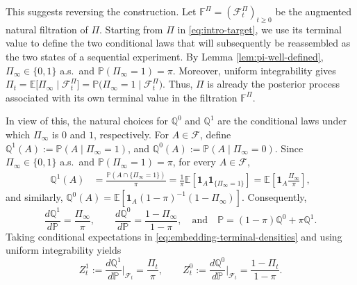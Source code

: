 \documentclass[11pt, reqno]{amsart}
\theoremstyle{plain}
\theoremstyle{remark}
\numberwithin{equation}{section}
\begin{document}
This suggests reversing the construction. Let $\mathbb{F}^\Pi=(\mathcal{F}^\Pi_t)_{t\geq0}$ be the augmented natural filtration of $\Pi$. Starting from $\Pi$ in \eqref{eq:intro-target}, we use its terminal value to define the two conditional laws that will subsequently be reassembled as the two states of a sequential experiment. By
Lemma \ref{lem:pi-well-defined},
$\Pi_\infty\in\{0,1\}$ a.s.~and
$\mathbb P(\Pi_\infty=1)=\pi$. Moreover, uniform integrability gives $\Pi_t
  =
  \mathbb E
  \bigl[\Pi_\infty\mid\mathcal F_t^\Pi\bigr]
  =
  \mathbb P
  \bigl(\Pi_\infty=1\mid\mathcal F_t^\Pi\bigr)$.
Thus, $\Pi$ is already the posterior process associated with its own
terminal value in the filtration $\mathbb F^\Pi$. 

In view of this, the natural choices for $\mathbb Q^0$ and
$\mathbb Q^1$ are the conditional laws under which $\Pi_{\infty}$ is $0$ and $1$, respectively. For $A\in\mathcal F$,
define $\mathbb Q^1(A)
  :=
  \mathbb P(A\mid\Pi_\infty=1)$, and $\mathbb Q^0(A)
  :=
  \mathbb P(A\mid\Pi_\infty=0)$.
Since $\Pi_\infty\in\{0,1\}$ a.s.~and
$\mathbb P(\Pi_\infty=1)=\pi$, for every $A\in\mathcal F$,
\[
\begin{aligned}
  \mathbb Q^1(A)
  &=
  \frac{\mathbb P(A\cap\{\Pi_\infty=1\})}{\pi}
  =
  \frac{1}{\pi}
  \mathbb E\left[
    \mathbf 1_A\mathbf 1_{\{\Pi_\infty=1\}}
  \right]=
  \mathbb E\left[
    \mathbf 1_A\frac{\Pi_\infty}{\pi}
  \right],
\end{aligned}
\]
and similarly, $\mathbb Q^0(A)
  =
  \mathbb E\left[
    \mathbf 1_A (1-\pi)^{-1}(1-\Pi_\infty)
  \right]$.
Consequently, 
\begin{equation}\label{eq:embedding-terminal-densities}
  \frac{d\mathbb Q^1}{d\mathbb P}
  =
  \frac{\Pi_\infty}{\pi},
  \qquad
  \frac{d\mathbb Q^0}{d\mathbb P}
  =
  \frac{1-\Pi_\infty}{1-\pi}, \quad \text{and} \quad \mathbb P=(1-\pi)\mathbb Q^0+\pi\mathbb Q^1.
\end{equation}
Taking conditional expectations in
\eqref{eq:embedding-terminal-densities} and using uniform integrability yields
\begin{equation}\label{eq:embedding-densities}
  Z_t^1
  :=
  \frac{d\mathbb Q^1}{d\mathbb P}
  \bigg|_{\mathcal F_t}
  =
  \frac{\Pi_t}{\pi},
  \qquad
  Z_t^0
  :=
  \frac{d\mathbb Q^0}{d\mathbb P}
  \bigg|_{\mathcal F_t}
  =
  \frac{1-\Pi_t}{1-\pi}.
\end{equation}
%

%
%
%
%
%
%
%
%
%
%
%
%
%
%
%
%
%
%
%
%
%
%
%
%
%
%
%
%
%
%
%
%
%
%
%
%
%
%
%
%
%
%
%
%
%
%
\end{document}
